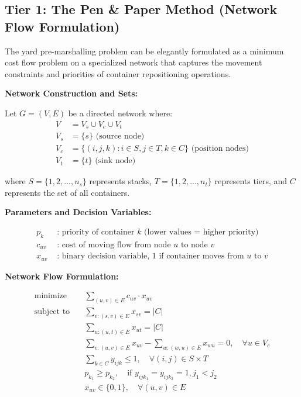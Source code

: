 \documentclass{article}
\begin{document}
\subsection{Tier 1: The Pen \& Paper Method (Network Flow Formulation)}

The yard pre-marshalling problem can be elegantly formulated as a minimum cost flow problem on a specialized network that captures the movement constraints and priorities of container repositioning operations.

\textbf{Network Construction and Sets:}

Let $G = (V, E)$ be a directed network where:
\begin{align}
V &= V_s \cup V_c \cup V_t \\
V_s &= \{s\} \text{ (source node)} \\
V_c &= \{(i,j,k) : i \in S, j \in T, k \in C\} \text{ (position nodes)} \\
V_t &= \{t\} \text{ (sink node)}
\end{align}

where $S = \{1,2,...,n_s\}$ represents stacks, $T = \{1,2,...,n_t\}$ represents tiers, and $C$ represents the set of all containers.

\textbf{Parameters and Decision Variables:}

\begin{align}
p_k &\text{ : priority of container } k \text{ (lower values = higher priority)} \\
c_{uv} &\text{ : cost of moving flow from node } u \text{ to node } v \\
x_{uv} &\text{ : binary decision variable, 1 if container moves from } u \text{ to } v
\end{align}

\textbf{Network Flow Formulation:}

\begin{align}
\text{minimize} \quad & \sum_{(u,v) \in E} c_{uv} \cdot x_{uv} \\
\text{subject to} \quad & \sum_{v:(s,v) \in E} x_{sv} = |C| \\
& \sum_{u:(u,t) \in E} x_{ut} = |C| \\
& \sum_{v:(u,v) \in E} x_{uv} - \sum_{w:(w,u) \in E} x_{wu} = 0, \quad \forall u \in V_c \\
& \sum_{k \in C} y_{ijk} \leq 1, \quad \forall (i,j) \in S \times T \\
& p_{k_1} \geq p_{k_2}, \quad \text{if } y_{ijk_1} = y_{ijk_2} = 1, j_1 < j_2 \\
& x_{uv} \in \{0,1\}, \quad \forall (u,v) \in E
\end{align}
\end{document}
